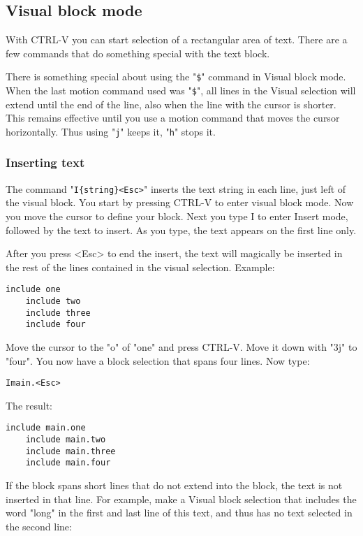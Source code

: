 \subsection{Visual block mode}
With CTRL-V you can start selection of a rectangular area of text.
There are a few commands that do something special with the text block.

There is something special about using the "\verb!$!" command in Visual block mode.
When the last motion command used was "\verb!$!", all lines in the Visual selection will extend until the end of the line, also when the line with the cursor is shorter.
This remains effective until you use a motion command that moves the cursor horizontally.
Thus using "\verb!j!" keeps it, "\verb!h!" stops it.

\subsubsection{Inserting text}
The command  "\verb!I{string}<Esc>!" inserts the text {string} in each line, just left of the visual block.
You start by pressing CTRL-V to enter visual block mode.
Now you move the cursor to define your block.
Next you type I to enter Insert mode, followed by the text to insert.
As you type, the text appears on the first line only.

After you press <Esc> to end the insert, the text will magically be inserted in the rest of the lines contained in the visual selection.
Example:

\begin{Verbatim}[samepage=true]
    include one 
    include two 
    include three 
    include four 
\end{Verbatim}

Move the cursor to the "o" of "one" and press CTRL-V.
Move it down with "3j" to "four".
You now have a block selection that spans four lines.
Now type:

\begin{Verbatim}[samepage=true]
 Imain.<Esc>
\end{Verbatim}

The result:

\begin{Verbatim}[samepage=true]
    include main.one 
    include main.two 
    include main.three 
    include main.four 
\end{Verbatim}

If the block spans short lines that do not extend into the block, the text is not inserted in that line.
For example, make a Visual block selection that includes the word "long" in the first and last line of this text, and thus has no text selected in the second line:

